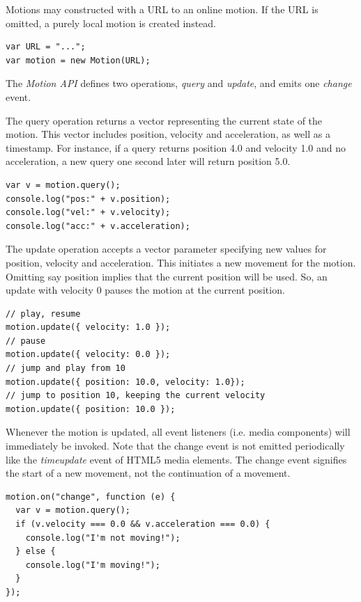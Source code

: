 Motions may constructed with a URL to an online motion. If the URL is omitted,
a purely local motion is created instead. 
\begin{lstlisting}[caption=Constructing a motion.]
var URL = "...";
var motion = new Motion(URL);
\end{lstlisting}

The \emph{Motion API} defines two operations,
\emph{query} and \emph{update}, and emits one \emph{change} event.



The query operation returns a vector representing the current state of the
motion. This vector includes position, velocity and acceleration, as well as a
timestamp. For instance, if a query returns position 4.0 and velocity 1.0 and no acceleration, a
new query one second later will return position 5.0.

\begin{lstlisting}[caption=Querying the motion to get a snapshot vector.]
var v = motion.query();
console.log("pos:" + v.position);
console.log("vel:" + v.velocity);
console.log("acc:" + v.acceleration);
\end{lstlisting}



The update operation accepts a vector parameter specifying new values for
position, velocity and acceleration. This initiates a new movement for the
motion. Omitting say position implies that the current position will be used.
So, an update with velocity 0 pauses the motion at the current position.

\begin{lstlisting}[caption=Querying the motion for a snapshot vector.]
// play, resume
motion.update({ velocity: 1.0 }); 
// pause
motion.update({ velocity: 0.0 });
// jump and play from 10
motion.update({ position: 10.0, velocity: 1.0});
// jump to position 10, keeping the current velocity
motion.update({ position: 10.0 });
\end{lstlisting}



Whenever the motion is updated, all event listeners (i.e. media components)
will immediately be invoked. Note that the change event is not emitted
periodically like the \emph{timeupdate} event of HTML5 media elements. The change event signifies the start of a
new movement, not the continuation of a movement.

\begin{lstlisting}[caption=Querying the motion for a snapshot vector.]
motion.on("change", function (e) {
  var v = motion.query();
  if (v.velocity === 0.0 && v.acceleration === 0.0) {
    console.log("I'm not moving!");
  } else {
    console.log("I'm moving!");
  }
});
\end{lstlisting}


